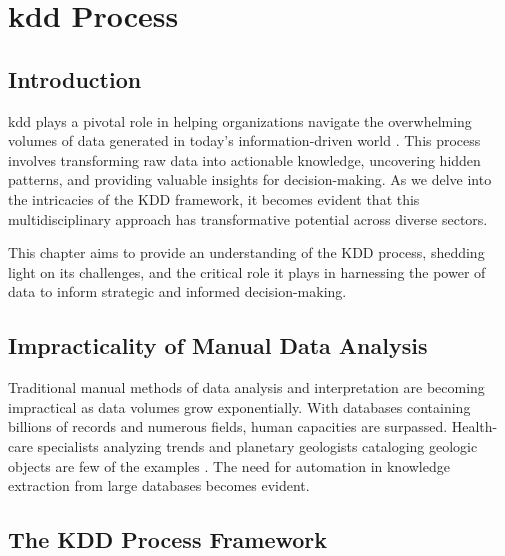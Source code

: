 %
%

\chapter{\ac{kdd} Process}


\section{Introduction}

\ac{kdd} plays a pivotal role in helping organizations navigate the overwhelming volumes of data generated in today's information-driven world \cite{Fayyad:1996}. This process involves transforming raw data into actionable knowledge, uncovering hidden patterns, and providing valuable insights for decision-making. As we delve into the intricacies of the KDD framework, it becomes evident that this multidisciplinary approach has transformative potential across diverse sectors. 

This chapter aims to provide an understanding of the KDD process, shedding light on its  challenges, and the critical role it plays in harnessing the power of data to inform strategic and informed decision-making.


\section{Impracticality of Manual Data Analysis}

Traditional manual methods of data analysis and interpretation are becoming impractical as data volumes grow exponentially. With databases containing billions of records and numerous fields, human capacities are surpassed. Health-care specialists analyzing trends and planetary geologists cataloging geologic objects are few of the examples \cite{Fayyad:1996}. The need for automation in knowledge extraction from large databases becomes evident.


\section{The KDD Process Framework}

